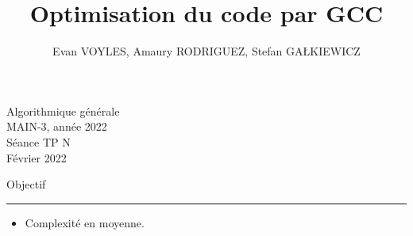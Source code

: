 \documentclass[10pt]{article} %
\title{Optimisation du code par GCC}
\author{Evan VOYLES, Amaury RODRIGUEZ, Stefan GA\L KIEWICZ}
\begin{document}

\vspace{-1cm}
\vspace{0.3cm}

{\raggedleft \color{mygold} Algorithmique générale\\
MAIN-3, année 2022\\
Séance TP N\\
Février 2022\\}

\vspace{1.23cm}

{\Large \noindent \color{mygold} Objectif}

{\color{mygold}\noindent\rule{\textwidth}{1pt}}
\vspace{0cm}
\begin{itemize}
    \item[{\color{mygold}\ding{43}}] Complexité en moyenne.
\end{itemize}


\newpage

\newcommand{\asgold}[1]{\textcolor{mygold}{{\bf#1}}}
\newcommand{\asgrey}[1]{\textcolor{gray}{{\bf#1}}}
\newcommand{\asred}[1]{\textcolor{red}{{\bf#1}}}
\newcommand{\asor}[1]{\textcolor{orange}{{\bf#1}}}
\newcommand{\ascy}[1]{\textcolor{cyan}{{\bf#1}}}
\newcommand{\asgr}[1]{\textcolor{mygreen}{{\bf#1}}}
\newcommand{\aspurp}[1]{\textcolor{mypurp}{{\bf#1}}}
\end{document}
